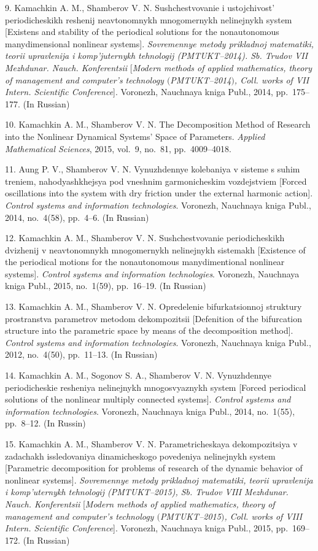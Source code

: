 {9. Kamachkin A. M., Shamberov V. N. Sushchestvovanie i
ustojchivost' periodicheskikh reshenij neavtonomnykh mnogomernykh
nelinejnykh system [Existens and stability of the periodical
solutions for the nonautonomous manydimensional nonlinear
systems]. {\it Sovremennye metody prikladnoj matematiki, teorii
upravlenija i komp'juternykh tehnologij (PMTUKT--2014). Sb. Trudov
VII Mezhdunar. Nauch. Konferentsii} [{\it Modern methods of
applied mathematics, theory of management and computer's
technology $($PMTUKT--2014$)$, Coll. works of VII Intern.
Scientific Conference}]. Voronezh, Nauchnaya kniga Publ., 2014,
pp.~175--177. (In Russian)

10. Kamachkin A. M., Shamberov V. N. The Decomposition Method of
Research into the Nonlinear Dynamical Systems' Space of
Parameters. {\it Applied Mathematical Sciences}, 2015, vol.~9,
no.~81, pp.~4009--4018.

11. Aung P. V., Shamberov V. N.   Vynuzhdennye kolebaniya v
sisteme s suhim treniem, nahodyashkhejsya pod vneshnim
garmonicheskim vozdejstviem [Forced oscillations into the system
with dry friction under the external harmonic action]. {\it
Control systems and information technologies}. Voronezh, Nauchnaya
kniga Publ., 2014, no.~4(58), pp.~4--6. (In Russian)

12. Kamachkin A. M., Shamberov V. N.  Sushchestvovanie
periodicheskikh dvizhenij v neavtonomnykh mnogomernykh nelinejnykh
sistemakh [Existence of the periodical motions for the
nonautonomous manydimentional nonlinear systems]. {\it Control
systems and information technologies}. Voronezh, Nauchnaya kniga
Publ., 2015, no.~1(59), pp.~16--19. (In Russian)

13. Kamachkin A. M., Shamberov V. N. Opredelenie bifurkatsionnoj
struktury prostranstva parametrov metodom dekompozitsii
[Defenition of the bifurcation structure into the parametric space
by means of the decomposition method]. {\it Control systems and
information technologies}. Voronezh, Nauchnaya kniga Publ., 2012,
no.~4(50), pp.~11--13. (In Russian)

14. Kamachkin A. M., Sogonov S. A., Shamberov V. N. Vynuzhdennye
periodicheskie resheniya nelinejnykh mnogosvyaznykh system [Forced
periodical solutions of the nonlinear multiply connected systems].
{\it Control systems and information technologies}. Voronezh,
Nauchnaya kniga Publ.,  2014, no.~1(55), pp.~8--12. (In Russin)

15. Kamachkin A. M., Shamberov V. N. Parametricheskaya
dekompozitsiya v zadachakh issledovaniya dinamicheskogo povedeniya
nelinejnykh system [Parametric decomposition for problems of
research of the dynamic behavior of nonlinear systems]. {\it
Sovremennye metody prikladnoj matematiki, teorii upravlenija i
komp'uternykh tehnologij (PMTUKT--2015), Sb. Trudov VIII
Mezhdunar. Nauch. Konferentsii}  [{\it Modern methods of applied
mathematics, theory of management and computer's technology
$($PMTUKT--2015$)$, Coll. works of VIII Intern. Scientific
Conference}].   Voronezh, Nauchnaya kniga Publ., 2015,
pp.~169--172. (In Russian)

}
